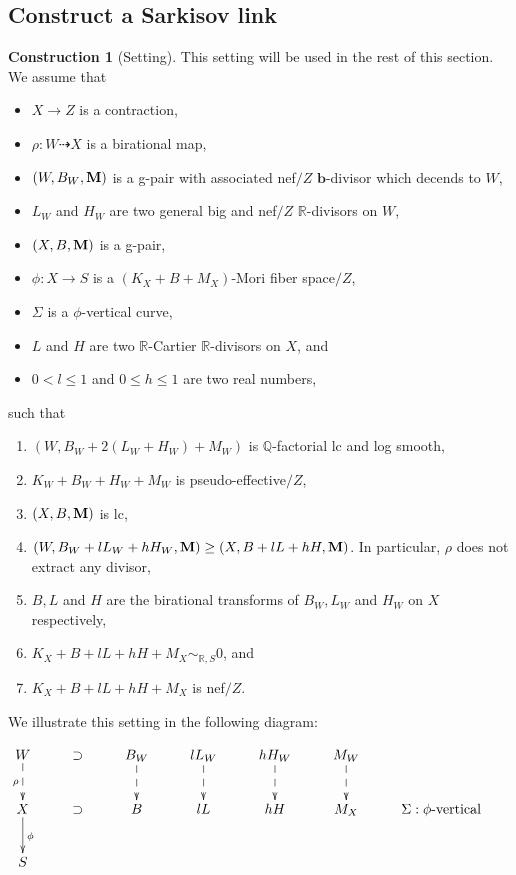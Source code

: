 \documentclass[11pt]{amsart}
\numberwithin{equation}{section}
\newcommand{\bb}{\bm{b}}
\newcommand{\Mm}{{\bf{M}}}
\newcommand{\Qq}{\mathbb{Q}}
\newcommand{\Rr}{\mathbb{R}}
\theoremstyle{definition}
\theoremstyle{definition}
\newtheorem{cons}[thm]{Construction}
\theoremstyle{definition}
\begin{document}
\subsection{Construct a Sarkisov link}

\begin{cons}[Setting]\label{cons: setting for sarkisov link}
This setting will be used in the rest of this section. We assume that
\begin{itemize}
    \item $X\rightarrow Z$ is a contraction,
    \item $\rho: W\dashrightarrow X$ is a birational map,
    \item $(W,B_W,\Mm)$ is a g-pair with associated nef$/Z$ $\bb$-divisor which decends to $W$,
    \item $L_W$ and $H_W$ are two general big and nef$/Z$ $\Rr$-divisors on $W$, 
    \item $(X,B,\Mm)$ is a g-pair, 
    \item $\phi: X\rightarrow S$ is a $(K_X+B+M_X)$-Mori fiber space$/Z$,
    \item $\Sigma$ is a $\phi$-vertical curve,
    \item $L$ and $H$ are two $\Rr$-Cartier $\Rr$-divisors on $X$, and
    \item $0<l\leq 1$ and $0\leq h\leq 1$ are two real numbers,
\end{itemize} 
such that
\begin{enumerate}
    \item $(W,B_W+2(L_W+H_W)+M_W)$ is $\Qq$-factorial lc and log smooth, 
    \item $K_W+B_W+H_W+M_W$ is pseudo-effective$/Z$,
    \item $(X,B,\Mm)$ is lc,
    \item $(W,B_W+lL_W+hH_W,\Mm)\geq (X,B+lL+hH,\Mm)$. In particular, $\rho$ does not extract any divisor,
    \item $B,L$ and $H$ are the birational transforms of $B_W,L_W$ and $H_W$ on $X$ respectively,
    \item $K_X+B+lL+hH+M_X\sim_{\mathbb R,S}0$, and
    \item $K_X+B+lL+hH+M_X$ is nef$/Z$.
\end{enumerate}
We illustrate this setting in the following diagram:
\medskip

\begin{center}$\xymatrix{
  W\ar@{-->}[d]_{\rho}&\supset & B_W\ar@{-->}[d] &lL_W\ar@{-->}[d] &hH_W\ar@{-->}[d] &M_W\ar@{-->}[d] &\\
      X \ar@{->}[d]^{\phi}&\supset & B &lL &hH &M_X  &\Sigma:\phi\text{-vertical}    \\
    S & }$
\end{center}
\end{cons}
\end{document}
